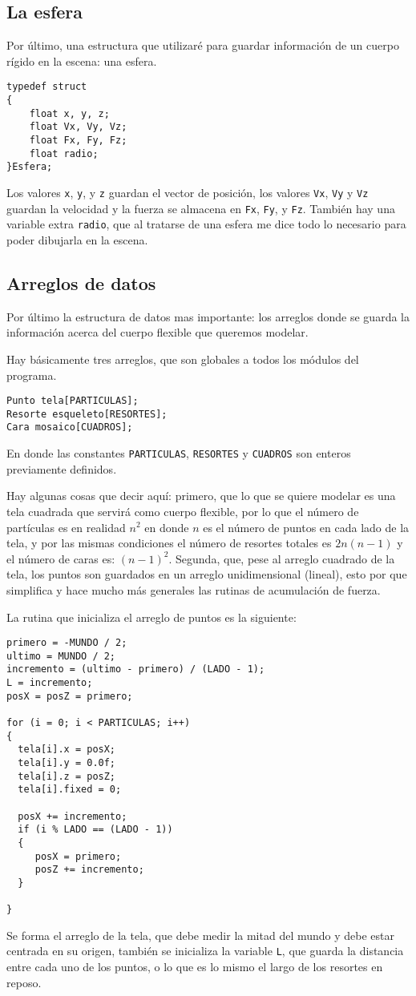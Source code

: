 \subsection{La esfera}
Por último, una estructura que utilizaré para guardar información de un cuerpo rígido en la escena: una esfera.
\begin{verbatim}
typedef struct
{
    float x, y, z;
    float Vx, Vy, Vz;
    float Fx, Fy, Fz;
    float radio;
}Esfera;
\end{verbatim} 
Los valores \verb|x|, \verb|y|, y \verb|z| guardan el vector de posición, los valores \verb|Vx|, \verb|Vy| y \verb|Vz| guardan la velocidad y la fuerza se almacena en \verb|Fx|, \verb|Fy|, y \verb|Fz|.
También hay una variable extra \verb|radio|, que al tratarse de una esfera me dice todo lo necesario para poder dibujarla en la escena.

\subsection{Arreglos de datos}

Por último la estructura de datos mas importante: los arreglos donde se guarda la información acerca del cuerpo flexible que queremos modelar.

Hay básicamente tres arreglos, que son globales a todos los módulos del programa.
\begin{verbatim}
Punto tela[PARTICULAS];
Resorte esqueleto[RESORTES];
Cara mosaico[CUADROS];
\end{verbatim} 
En donde las constantes \verb|PARTICULAS|, \verb|RESORTES| y \verb|CUADROS| son enteros previamente definidos.

Hay algunas cosas que decir aquí: primero, que lo que se quiere modelar es una tela cuadrada que servirá como cuerpo flexible, por lo que el número de partículas es en realidad $n^{2}$ en donde $n$ es el número de puntos en cada lado de la tela, y por las mismas condiciones el número de resortes totales es $2 n (n - 1)$ y el número de caras es: $(n-1)^{2}$.
Segunda, que, pese al arreglo cuadrado de la tela, los puntos son guardados en un arreglo unidimensional (lineal), esto por que simplifica y hace mucho más generales las rutinas de acumulación de fuerza.

La rutina que inicializa el arreglo de puntos es la siguiente:
\begin{verbatim}
primero = -MUNDO / 2;
ultimo = MUNDO / 2;
incremento = (ultimo - primero) / (LADO - 1);
L = incremento;
posX = posZ = primero;

for (i = 0; i < PARTICULAS; i++)
{
  tela[i].x = posX;
  tela[i].y = 0.0f;
  tela[i].z = posZ;
  tela[i].fixed = 0;

  posX += incremento;
  if (i % LADO == (LADO - 1))
  {
     posX = primero;
     posZ += incremento;
  }

}
\end{verbatim} 
Se forma el arreglo de la tela, que debe medir la mitad del mundo y debe estar centrada en su origen, también se inicializa la variable \verb|L|, que guarda la distancia entre cada uno de los puntos, o lo que es lo mismo el largo de los resortes en reposo.

